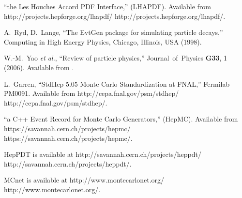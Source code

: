 \documentclass[11pt,letterpaper]{article}
\begin{document}
\begin{thebibliography}{99}
  ``the Les Houches Accord PDF Interface,'' (LHAPDF).
  Available from 
  \htmladdnormallink
  {http://projects.hepforge.org/lhapdf/}
  {http://projects.hepforge.org/lhapdf/}.

  A.~Ryd, D.~Lange,
  ``The EvtGen package for simulating particle decays,''
  Computing in High Energy Physics, Chicago, Illinois, USA (1998).

  W.-M.~Yao {\it et al.}, ``Review of particle physics,''
  Journal\ of\ Physics {\bf G33}, 1 (2006).
  Available from .


  L.~Garren, ``StdHep 5.05 Monte Carlo Standardization at FNAL,''
  Fermilab PM0091. Available from 
  \htmladdnormallink
  {http://cepa.fnal.gov/psm/stdhep/}
  {http://cepa.fnal.gov/psm/stdhep/}.

  ``a C++ Event Record for Monte Carlo Generators,'' (HepMC).
  Available from 
  \htmladdnormallink
  {https://savannah.cern.ch/projects/hepmc/}
  {https://savannah.cern.ch/projects/hepmc/}.

  HepPDT is available at \htmladdnormallink
  {http://savannah.cern.ch/projects/heppdt/}
  {http://savannah.cern.ch/projects/heppdt/}.

  MCnet is available at \htmladdnormallink
  {http://www.montecarlonet.org/}
  {http://www.montecarlonet.org/}.

\end{thebibliography}

%
%
\end{document}
